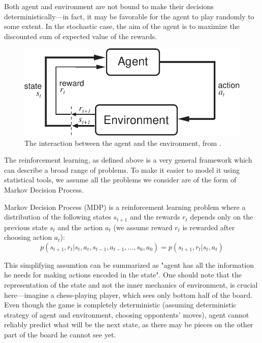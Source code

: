 Both agent and environment are not bound to make their decisions deterministically---in fact, it may be favorable for the agent to play randomly to some extent. In the stochastic case, the aim of the agent is to maximize the discounted sum of expected value of the rewards.

\begin{figure}[!h]
  \center
  \includegraphics[scale=0.8]{images/Agent-Env-crop.pdf}
  \caption{The interaction between the agent and the environment, from \cite{reinforcement-book}.}
\end{figure}

The reinforcement learning, as defined above is a very general framework which can describe a broad range of problems. To make it easier to model it using statistical tools, we assume all the problems we consider are of the form of Markov Decision Process.

Markov Decision Process (MDP) is a reinforcement learning problem where a distribution of the following states $s_{t+1}$ and the rewards $r_t$ depends only on the previous state $s_t$ and the action $a_t$ (we assume reward $r_t$ is rewarded after choosing action $a_t$):
\begin{equation} \label{mdp}
  p(s_{t+1}, r_t|s_t, a_t, s_{t-1}, a_{t-1}, \ldots, s_0, a_0) = p(s_{t+1}, r_t|s_t, a_t)
\end{equation}

This simplifying assumtion can be summarized as "agent has all the information he needs for making actions encoded in the state". One should note that the representation of the state and not the inner mechanics of environment, is crucial here---imagine a chess-playing player, which sees only bottom half of the board. Even though the game is completely deterministic (assuming deterministic strategy of agent and environment, choosing oppontents' moves), agent cannot reliably predict what will be the next state, as there may be pieces on the other part of the board he cannot see yet.

